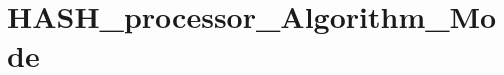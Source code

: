 \hypertarget{group___h_a_s_h__processor___algorithm___mode}{\section{H\-A\-S\-H\-\_\-processor\-\_\-\-Algorithm\-\_\-\-Mode}
\label{group___h_a_s_h__processor___algorithm___mode}
}
